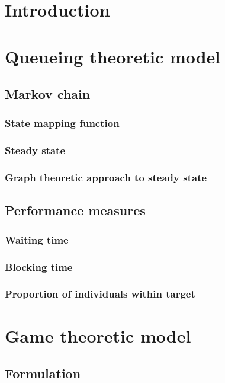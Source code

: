 \documentclass{article}
\begin{document}
    \maketitle
    \tableofcontents
    \newpage

    \section{Introduction}
    \section{Queueing theoretic model}
        \subsection{Markov chain}
            \subsubsection{State mapping function}
            \subsubsection{Steady state}
            \subsubsection{Graph theoretic approach to steady state}
        \subsection{Performance measures}
            \subsubsection{Waiting time}
            \subsubsection{Blocking time}
            \subsubsection{Proportion of individuals within target}
    \section{Game theoretic model}
        \subsection{Formulation}
\end{document}
